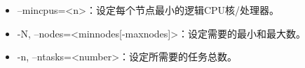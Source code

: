\begin{itemize}
	\item --mincpus=<n>：设定每个节点最小的逻辑CPU核/处理器。
    \item -N, --nodes=<minnodes[-maxnodes]>：设定需要的最小和最大数。
    \item -n, --ntasks=<number>：设定所需要的任务总数。
%
%
%
%
%
%

\end{itemize}
